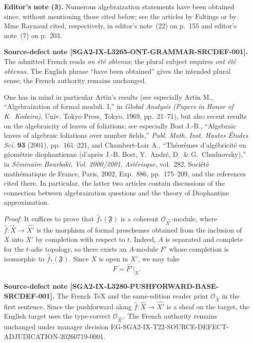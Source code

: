 \medskip
\noindent\colorbox{softgray}{\parbox{0.95\linewidth}{\small
\color{notegray}\textbf{Editor's note (3).}
Numerous algebraization statements have been obtained since, without
mentioning those cited below; see the articles by Faltings or by Mme Raynaud
cited, respectively, in editor's note~(22) on p.~155 and editor's note~(7)
on p.~203.

\smallskip
{\footnotesize\textbf{Source-defect note
[SGA2-IX-L3265-ONT-GRAMMAR-SRCDEF-001].}
The admitted French reads \emph{on \'et\'e obtenus}; the plural subject
requires \emph{ont \'et\'e obtenus}. The English phrase ``have been
obtained'' gives the intended plural sense; the French authority remains
unchanged.}

\smallskip
One has in mind in particular Artin's results (see especially
Artin M., ``Algebraization of formal moduli. I,'' in \emph{Global Analysis
(Papers in Honor of K.~Kodaira)}, Univ. Tokyo Press, Tokyo, 1969,
pp.~21--71), but also recent results on the algebraicity of leaves of
foliations; see especially Bost J.-B., ``Algebraic leaves of algebraic
foliations over number fields,'' \emph{Publ. Math. Inst. Hautes
\'Etudes Sci.} \textbf{93} (2001), pp.~161--221, and Chambert-Loir A.,
``Th\'eor\`emes d'alg\'ebricit\'e en g\'eom\'etrie diophantienne (d'apr\`es
J.-B. Bost, Y.~Andr\'e, D.~\& G.~Chudnovsky),'' in \emph{S\'eminaire
Bourbaki, Vol. 2000/2001}, \emph{Ast\'erisque}, vol.~282, Soci\'et\'e
math\'ematique de France, Paris, 2002, Exp.~886, pp.~175--209, and the
references cited there. In particular, the latter two articles contain
discussions of the connection between algebraization questions and the
theory of Diophantine approximation.}}

\medskip
\noindent\textit{Proof.}\quad
It suffices to prove that $\widehat f_*(\mathfrak F)$ is a coherent
$\mathcal O_{\widehat{X'}}$-module, where
$\widehat f\colon\widehat X\to\widehat{X'}$ is the morphism of formal
preschemes obtained from the inclusion of $X$ into $X'$ by completion with
respect to $t$. Indeed, $A$ is separated and complete for the $t$-adic
topology, so there exists an $A$-module $F'$ whose completion is isomorphic
to $\widehat f_*(\mathfrak F)$. Since $X$ is open in $X'$, we may take
\[
F=\widetilde{F'}\big|_X.
\]

\noindent\colorbox{softgray}{\parbox{0.95\linewidth}{\footnotesize
\color{notegray}\textbf{Source-defect note
[SGA2-IX-L3280-PUSHFORWARD-BASE-SRCDEF-001].}
The French TeX and the same-edition reader print
$\mathcal O_{\widehat X}$ in the first sentence. Since the pushforward along
$\widehat f\colon\widehat X\to\widehat{X'}$ is a sheaf on the target, the
English target uses the type-correct $\mathcal O_{\widehat{X'}}$. The French
authority remains unchanged under manager decision
EG-SGA2-IX-T22-SOURCE-DEFECT-ADJUDICATION-20260719-0001.}}

